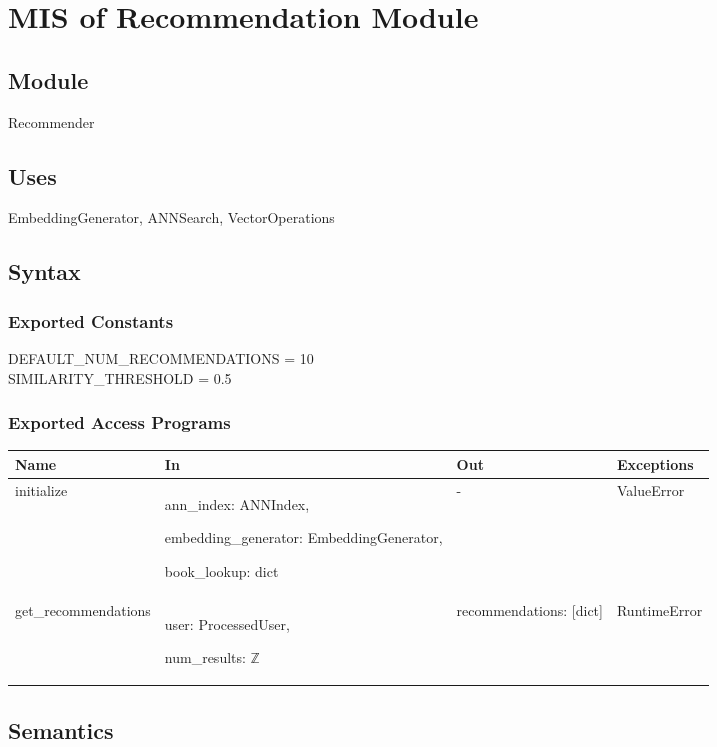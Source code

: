 \documentclass[12pt, titlepage]{article}
\begin{document}
\section{MIS of Recommendation Module } \label{ModuleR}

\subsection{Module}

Recommender

\subsection{Uses}
EmbeddingGenerator, ANNSearch, VectorOperations

\subsection{Syntax}

\subsubsection{Exported Constants}
DEFAULT\_NUM\_RECOMMENDATIONS = 10\\
SIMILARITY\_THRESHOLD = 0.5
\subsubsection{Exported Access Programs}

\begin{center}
  \begin{tabular}{p{5cm} p{4cm} p{4cm} p{2cm}}
  \hline
  \textbf{Name} & \textbf{In} & \textbf{Out} & \textbf{Exceptions} \\
  \hline
  initialize & ann\_index: ANNIndex,
  
  embedding\_generator: EmbeddingGenerator,
  
  book\_lookup: dict & -& ValueError \\
  \hline
  get\_recommendations & user: ProcessedUser,
  
  num\_results: $\mathbb{Z}$ & recommendations: [dict] & RuntimeError \\
  \hline
  \end{tabular}
  \end{center}

\subsection{Semantics}
\end{document}
